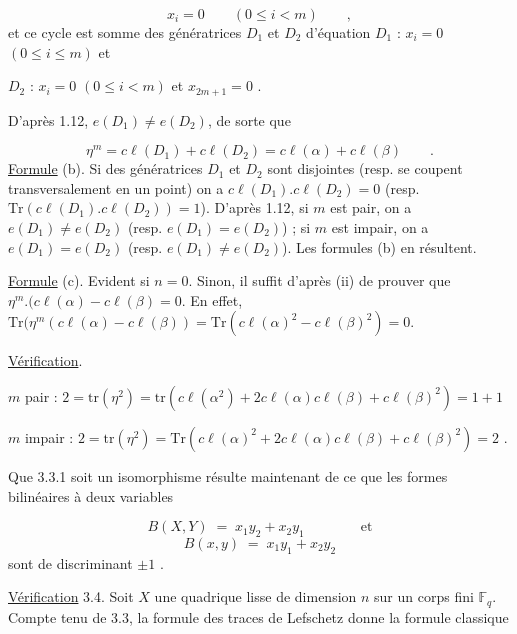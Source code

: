 \begin{equation*}
x_{i} = 0 \qquad (0 \leqslant i < m) \qquad ,
\end{equation*}
et ce cycle est somme des génératrices $D_{1}$ et $D_{2}$ d'équation
$D_{1}$ : $x_{i} = 0$ $(0 \leqslant i \leqslant m)$ \quad et

$D_{2}$ : $x_{i} = 0$ $(0 \leqslant i < m)$ et $x_{2m+1} = 0$ .

D'après 1.12, $e(D_{1}) \neq e(D_{2})$, de sorte que

\begin{equation*}
\eta^{m} = c\ell(D_{1}) + c\ell(D_{2}) = c\ell(\alpha) + c\ell(\beta) \qquad .
\end{equation*}
\underline{Formule} (b). Si des génératrices $D_{1}$ et $D_{2}$ sont disjointes (resp. se coupent transversalement en un point) on a $c\ell(D_{1}).c\ell(D_{2}) = 0$ (resp. $\mathrm{Tr}(c\ell(D_{1}).c\ell(D_{2})) = 1$). D'après 1.12, si $m$ est pair, on a $e(D_{1}) \neq e(D_{2})$ (resp. $e(D_{1}) = e(D_{2})$) ; si $m$ est impair, on a $e(D_{1}) = e(D_{2})$ (resp. $e(D_{1}) \neq e(D_{2})$). Les formules (b) en résultent.

\underline{Formule} (c). Evident si $n = 0$. Sinon, il suffit d'après (ii) de prouver que $\eta^{m}.(c\ell(\alpha)-c\ell(\beta) = 0$. En effet, $\mathrm{Tr}(\eta^{m}(c\ell(\alpha)-c\ell(\beta)) = \mathrm{Tr}(c\ell(\alpha)^{2}-c\ell(\beta)^{2})=0$.

\underline{Vérification}.

$m$ pair : $2 = \mathrm{tr}(\eta^{2}) = \mathrm{tr}(c\ell(\alpha^{2})+ 2c\ell(\alpha)c\ell(\beta) + c\ell(\beta)^{2}) = 1 + 1$

$m$ impair : $2 = \mathrm{tr}(\eta^{2}) = \mathrm{Tr}(c\ell(\alpha)^{2} + 2c\ell(\alpha)c\ell(\beta) + c\ell(\beta)^{2}) = 2$ .

Que 3.3.1 soit un isomorphisme résulte maintenant de ce que les formes bilinéaires à deux variables

\begin{equation*}
B(X,Y) \; = \; x_{1}y_{2} + x_{2}y_{1} \qquad\qquad \mathrm{et}
\end{equation*}
\begin{equation*}
B(x,y) \; = \; x_{1}y_{1} + x_{2}y_{2}
\end{equation*}
sont de discriminant $\pm 1$ .



\underline{Vérification} 3.4. Soit $X$ une quadrique lisse de dimension $n$ sur un corps fini $\mathbb{F}_q$. Compte tenu de 3.3, la formule des traces de Lefschetz donne la formule classique

